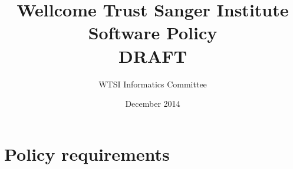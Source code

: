 \documentclass[10pt,a4paper]{article}
\begin{document}
\title{
Wellcome Trust Sanger Institute \\
Software Policy\\
DRAFT
}
\author{WTSI Informatics Committee}
\date{December 2014}

\maketitle

\newcommand{\exectitle}[0]{Chief Operating Officer}

\newcommand{\execperson}[0]{Martin Dougherty} 

\newcommand{\filename}[1]{\texttt{#1}} 

\newenvironment{boilerplate}[1][]
  {\minipage{\linewidth}%
   \lstset{basicstyle=\ttfamily\footnotesize,breaklines=false,frame=shadowbox,rulesepcolor=\color{blue},#1}}
   {\endminipage}%

\setlength{\parindent}{0pt} %

\setlength{\parskip}{4mm plus2mm minus2mm}

\let\stdsection\section
\renewcommand\section{\newpage\stdsection}




\section{Policy requirements}
\label{section:policy}

\end{document}
